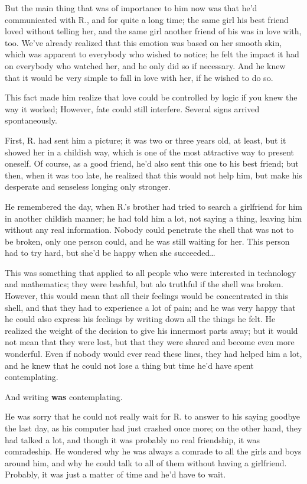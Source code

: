 But the main thing that was of importance to him now was that he'd communicated with R., and for quite a long time; the same girl his best friend loved without telling her, and the same girl another friend of his was in love with, too. We've already realized that this emotion was based on her smooth skin, which was apparent to everybody who wished to notice; he felt the impact it had on everybody who watched her, and he only did so if necessary. And he knew that it would be very simple to fall in love with her, if he wished to do so.

This fact made him realize that love could be controlled by logic if you knew the way it worked; However, fate could still interfere. Several signs arrived spontaneously.

First, R. had sent him a picture; it was two or three years old, at least, but it showed her in a childish way, which is one of the most attractive way to present oneself. Of course, as a good friend, he'd also sent this one to his best friend; but then, when it was too late, he realized that this would not help him, but make his desperate and senseless longing only stronger.

He remembered the day, when R.'s brother had tried to search a girlfriend for him in another childish manner; he had told him a lot, not saying a thing, leaving him without any real information. Nobody could penetrate the shell that was not to be broken, only one person could, and he was still waiting for her. This person had to try hard, but she'd be happy when she succeeded\ldots

This was something that applied to all people who were interested in technology and mathematics; they were bashful, but alo truthful if the shell was broken. However, this would mean that all their feelings would be concentrated in this shell, and that they had to experience a lot of pain; and he was very happy that he could also express his feelings by writing down all the things he felt. 
He realized the weight of the decision to give his innermost parts away; but it would not mean that they were lost, but that they were shared and become even more wonderful. Even if nobody would ever read these lines, they had helped him a lot, and he knew that he could not lose a thing but time he'd have spent contemplating.

And writing \textbf{was} contemplating.

He was sorry that he could not really wait for R. to answer to his saying goodbye the last day, as his computer had just crashed once more; on the other hand, they had talked a lot, and though it was probably no real friendship, it was comradeship. He wondered why he was always a comrade to all the girls and boys around him, and why he could talk to all of them without having a girlfriend. 
Probably, it was just a matter of time and he'd have to wait.

